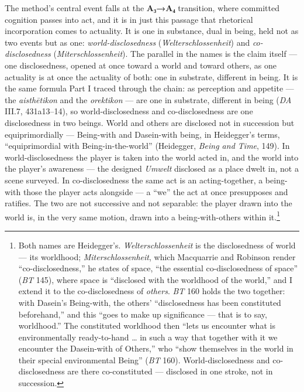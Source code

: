 \documentclass{article}
\begin{document}
The method's central event falls at the \textbf{A₃→A₄} transition, where committed cognition passes into act, and it is in just this passage that rhetorical incorporation comes to actuality. It is one in substance, dual in being, held not as two events but as one: \textit{world-disclosedness} (\textit{Welterschlossenheit}) and \textit{co-disclosedness} (\textit{Miterschlossenheit}). The parallel in the names is the claim itself — one disclosedness, opened at once toward a world and toward others, as one actuality is at once the actuality of both: one in substrate, different in being. It is the same formula Part I traced through the chain: as perception and appetite — the \textit{aisthētikon} and the \textit{orektikon} — are one in substrate, different in being (\textit{DA} III.7, 431a13–14), so world-disclosedness and co-disclosedness are one disclosedness in two beings. World and others are disclosed not in succession but equiprimordially — Being-with and Dasein-with being, in Heidegger's terms, ``equiprimordial with Being-in-the-world'' (Heidegger, \textit{Being and Time}, 149). In world-disclosedness the player is taken into the world acted in, and the world into the player's awareness — the designed \textit{Umwelt} disclosed as a place dwelt in, not a scene surveyed. In co-disclosedness the same act is an acting-together, a being-with those the player acts alongside — a ``we'' the act at once presupposes and ratifies. The two are not successive and not separable: the player drawn into the world is, in the very same motion, drawn into a being-with-others within it.\footnote{Both names are Heidegger's. \textit{Welterschlossenheit} is the disclosedness of world — its worldhood; \textit{Miterschlossenheit}, which Macquarrie and Robinson render ``co-disclosedness,'' he states of space, ``the essential co-disclosedness of space'' (\textit{BT} 145), where space is ``disclosed with the worldhood of the world,'' and I extend it to the co-disclosedness of \textit{others}. \textit{BT} 160 holds the two together: with Dasein's Being-with, the others' ``disclosedness has been constituted beforehand,'' and this ``goes to make up significance — that is to say, worldhood.'' The constituted worldhood then ``lets us encounter what is environmentally ready-to-hand … in such a way that together with it we encounter the Dasein-with of Others,'' who ``show themselves in the world in their special environmental Being'' (\textit{BT} 160). World-disclosedness and co-disclosedness are there co-constituted — disclosed in one stroke, not in succession.}
\end{document}
